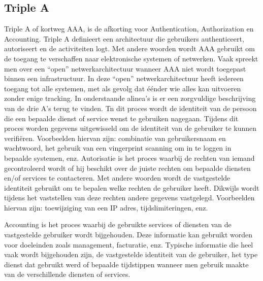 \subsection{Triple A }
Triple A of kortweg AAA, is de afkorting voor Authentication, Authorization en Accounting. Triple A definieert een architectuur die gebruikers authenticeert, autoriseert en de activiteiten logt. Met andere woorden wordt AAA gebruikt om de toegang te verschaffen naar elektronische systemen of netwerken.
\newline
\newline
Vaak spreekt men over een “open” netwerkarchitectuur wanneer AAA niet wordt toegepast binnen een infrastructuur. In deze “open” netwerkarchitectuur heeft iedereen toegang tot alle systemen, met als gevolg dat éénder wie alles kan uitvoeren zonder enige tracking.
\newline
\newline
In onderstaande alinea’s is er een zorgvuldige beschrijving van de drie A’s terug te vinden.
\newline
Tn dit proces wordt de identiteit van de persoon die een bepaalde dienst of service wenst te gebruiken nagegaan. Tijdens dit proces worden gegevens uitgewisseld om de identiteit van de gebruiker te kunnen verifiëren. Voorbeelden hiervan zijn: combinatie van gebruikersnaam en wachtwoord, het gebruik van een vingerprint scanning om in te loggen in bepaalde systemen, enz.
\newpage
{}
\newline 
Autorisatie is het proces waarbij de rechten van iemand gecontroleerd wordt of hij beschikt over de juiste rechten om bepaalde diensten en/of services te contacteren. Met andere woorden wordt de vastgestelde identiteit gebruikt om te bepalen welke rechten de gebruiker heeft. Dikwijls wordt tijdens het vaststellen van deze rechten andere gegevens vastgelegd. Voorbeelden hiervan zijn: toewijziging van een IP adres, tijdslimiteringen, enz.

\newline
Accounting is het proces waarbij de gebruikte services of diensten van de vastgestelde gebruiker wordt bijgehouden. Deze informatie kan gebruikt worden voor doeleinden zoals management, facturatie, enz. Typische informatie die heel vaak wordt bijgehouden zijn, de vastgestelde identiteit van de gebruiker, het type dienst dat gebruikt werd of bepaalde tijdstippen wanneer men gebruik maakte van de verschillende diensten of services. 

